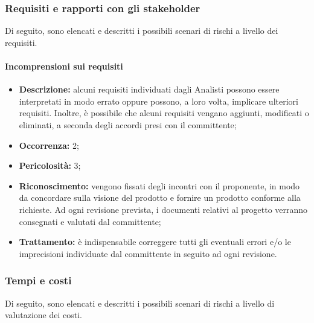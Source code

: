 \subsubsection{Requisiti e rapporti con gli stakeholder}

Di seguito, sono elencati e descritti i possibili scenari di rischi a livello dei requisiti.

\paragraph{Incomprensioni sui requisiti}
\begin{itemize}
	\item \textbf{Descrizione:} alcuni requisiti individuati dagli Analisti possono essere interpretati in modo errato oppure possono, a loro volta, implicare ulteriori requisiti. Inoltre, è possibile che alcuni requisiti vengano aggiunti, modificati o eliminati, a seconda degli accordi presi con il committente;
	\item \textbf{Occorrenza:} 2;
	\item \textbf{Pericolosità:} 3;
	\item \textbf{Riconoscimento:} vengono fissati degli incontri con il proponente, in modo da concordare sulla visione del prodotto e fornire un prodotto conforme alla richieste. Ad ogni revisione prevista, i documenti relativi al progetto verranno consegnati e valutati dal committente;
	\item \textbf{Trattamento:} è indispensabile correggere tutti gli eventuali errori e/o le imprecisioni individuate dal committente in seguito ad ogni revisione.
\end{itemize}

\subsubsection{Tempi e costi}

Di seguito, sono elencati e descritti i possibili scenari di rischi a livello di valutazione dei costi.

